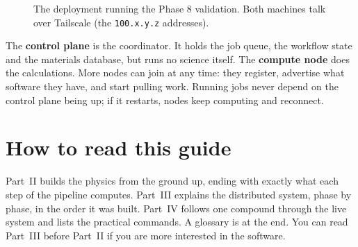 \documentclass[11pt,a4paper]{report}
\newcommand{\code}[1]{\texttt{#1}}
\begin{document}
\begin{figure}[h]
\centering
{}
\caption{The deployment running the Phase 8 validation. Both machines talk over Tailscale
(the \code{100.x.y.z} addresses).}
\label{fig:deploy}
\end{figure}

The \textbf{control plane} is the coordinator. It holds the job queue, the workflow state
and the materials database, but runs no science itself. The \textbf{compute node} does the
calculations. More nodes can join at any time: they register, advertise what software they
have, and start pulling work. Running jobs never depend on the control plane being up; if
it restarts, nodes keep computing and reconnect.

\section{How to read this guide}

Part~II builds the physics from the ground up, ending with exactly what each step of the
pipeline computes. Part~III explains the distributed system, phase by phase, in the order
it was built. Part~IV follows one compound through the live system and lists the practical
commands. A glossary is at the end. You can read Part~III before Part~II if you are more
interested in the software.
\end{document}
